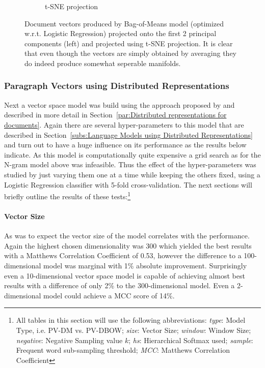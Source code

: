 \begin{figure}[h]
\begin{subfigure}[b]{0.48\textwidth}
      \caption{t-SNE projection}
      \label{fig:exp-vector-space-bom-tsne}
    \end{subfigure}
    \caption{Document vectors produced by Bag-of-Means model (optimized w.r.t. Logistic Regression) projected onto the first 2 principal components (left) and projected using t-SNE projection. It is clear that even though the vectors are simply obtained by averaging they do indeed produce somewhat seperable manifolds.}
  \label{fig:exp-vector-space-bom}
\end{figure}

\subsubsection{Paragraph Vectors using Distributed Representations}

Next a vector space model was build using the approach proposed by  \cite{Le:2014aa} and described in more detail in Section~\ref{par:Distributed representations for documents}. Again there are several hyper-parameters to this model that are described in Section~\ref{subs:Language Models using Distributed Representations} and turn out to have a huge influence on its performance as the results below indicate. As this model is computationally quite expensive a grid search as for the N-gram model above was infeasible. Thus the effect of the hyper-parameters was studied by just varying them one at a time while keeping the others fixed, using a Logistic Regression classifier with 5-fold cross-validation.
The next sections will briefly outline the results of these tests:\footnote{All tables in this section will use the following abbreviations: \emph{type}: Model Type, i.e. PV-DM vs. PV-DBOW; \emph{size}: Vector Size; \emph{window}: Window Size; \emph{negative}: Negative Sampling value $k$; \emph{hs}: Hierarchical Softmax used; \emph{sample}: Frequent word sub-sampling threshold; \emph{MCC}: Matthews Correlation Coefficient}

\paragraph{Vector Size}
As was to expect the vector size of the model correlates with the performance. Again the highest chosen dimensionality was 300 which yielded the best results with a Matthews Correlation Coefficient of 0.53, however the difference to a 100-dimensional model was marginal with 1\% absolute improvement. Surprisingly even a 10-dimensional vector space model is capable of achieving almost best results with a difference of only 2\% to the 300-dimensional model. Even a 2-dimensional model could achieve a MCC score of 14\%.

